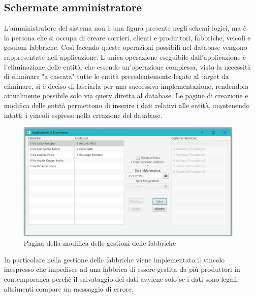 \documentclass[a4paper,12pt]{report}
\begin{document}
\subsection*{Schermate amministratore}
L'amministratore del sistema non è una figura presente negli schemi logici, ma è la persona che si occupa di creare corrieri, clienti e produttori, fabbriche, veicoli e gestioni fabbriche. 
Così facendo queste operazioni possibili nel database vengono rappresentate nell'applicazione. L'unica operazione eseguibile dall'applicazione è l'eliminazione delle entità, 
che essendo un'operazione complessa, vista la necessità di eliminare "a cascata" tutte le entità precedentemente legate al target da eliminare, 
si è deciso di lasciarla per una successiva implementazione, rendendola attualmente possibile solo via query diretta al database. 
Le pagine di creazione e modifica delle entità permettono di inserire i dati relativi alle entità, mantenendo intatti i vincoli espressi nella creazione del database. 
\begin{figure}[H]
	\centering{}
	\includegraphics[width=\textwidth]{img/Application/Admin.jpg}
	\caption{Pagina della modifica delle gestioni delle fabbriche}
\end{figure}
In particolare nella gestione delle fabbriche viene implementato il vincolo inespresso che impedisce ad una fabbrica di essere gestita da più produttori in contemporanea 
perchè il salvataggio dei dati avviene solo se i dati sono legali, altrimenti compare un messaggio di errore.
\end{document}
